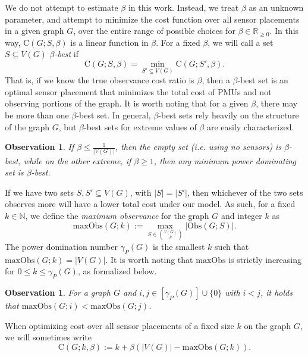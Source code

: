 \documentclass{article}
\newtheorem{observation}[theorem]{Observation}
\begin{document}
        We do not attempt to estimate $\beta$ in this work.
        Instead, we treat $\beta$ as an unknown parameter, and attempt to minimize the cost function over all sensor placements in a given graph $G$, over the entire range of possible choices for $\beta\in \mathbb{R}_{\geq 0}$.
        In this way, $\mathrm{C}(G;S,\beta)$ is a linear function in $\beta$.
        For a fixed $\beta$, we will call a set $S\subseteq V(G)$ \emph{$\beta$-best} if 
        	\[
        	\mathrm{C}(G;S,\beta)=\min_{S'\subseteq  V(G)} \mathrm{C}(G;S',\beta).
        	\]
        That is, if we know the true observance cost ratio is $\beta$, then a $\beta$-best set is an optimal sensor placement that minimizes the total cost of PMUs and not observing portions of the graph.
        It is worth noting that for a given $\beta$, there may be more than one $\beta$-best set.
        In general, $\beta$-best sets rely heavily on the structure of the graph $G$, but $\beta$-best sets for extreme values of $\beta$ are easily characterized.
        
        \begin{observation}\label{observation beta small or large}
        	If $\beta\leq \frac{1}{|V(G)|}$, then the empty set (i.e. using no sensors) is $\beta$-best, while on the other extreme, if $\beta\geq 1$, then any minimum power dominating set is $\beta$-best.
        \end{observation}
        
        If we have two sets $S,S'\subseteq V(G)$, with $|S|=|S'|$, then whichever of the two sets observes more will have a lower total cost under our model.
        As such, for a fixed $k\in \mathbb{N}$, we define the \emph{maximum observance} for the graph $G$ and integer $k$ as 
        \[
            \mathrm{maxObs}(G;k):=\max_{S\in \binom{V(G)}{k}}|\mathrm{Obs}(G;S)|.
        \]
        The power domination number $\gamma_P(G)$ is the smallest $k$ such that $\mathrm{maxObs}(G;k)=|V(G)|$. It is worth noting that $\mathrm{maxObs}$ is strictly increasing for $0\leq k\leq \gamma_P(G)$, as formalized below.
        
        \begin{observation}\label{observation more sensors means more observed}
        	For a graph $G$ and $i,j\in [\gamma_P(G)]\cup \{0\}$ with $i<j$, it holds that $\mathrm{maxObs}(G;i)<\mathrm{maxObs}(G;j)$.
        \end{observation}
        
        When optimizing cost over all sensor placements of a fixed size $k$ on the graph $G$, we will sometimes write
        \[
        \mathrm{C}(G;k,\beta):=k+\beta(|V(G)|-\mathrm{maxObs}(G;k)).
        \]
        
\end{document}
